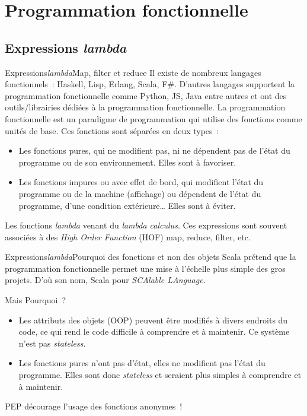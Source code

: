 \documentclass{beamer}
\begin{document}
    \section{Programmation fonctionnelle}

    \subsection{Expressions \textit{lambda}}
    \begin{frame}[fragile]{Expressions\textit{lambda}}{Map, filter et reduce}
        \small
        Il existe de nombreux langages fonctionnels~: Haskell, Lisp, Erlang, Scala, F\#.
        \bigbreak
        D'autres langages supportent la programmation fonctionnelle comme Python, JS, Java entre autres et ont des outils/librairies dédiées à la programmation fonctionnelle.
        \bigbreak
        La programmation fonctionnelle est un paradigme de programmation qui utilise des fonctions comme unités de base.
        Ces fonctions sont séparées en deux types~:
        \begin{itemize}
            \item Les fonctions pures, qui ne modifient pas, ni ne dépendent pas de l'état du programme ou de son environnement. Elles sont à favoriser.
            \item Les fonctions impures ou avec effet de bord, qui modifient l'état du programme ou de la machine (affichage) ou dépendent de l'état du programme, d'une condition extérieure\ldots{} Elles sont à éviter.
        \end{itemize}
        Les fonctions \textit{lambda} venant du \textit{lambda calculus}.
        Ces expressions sont souvent associées à des \textit{High Order Function} (HOF) map, reduce, filter, etc.
    \end{frame}

    \begin{frame}{Expressions\textit{lambda}}{Pourquoi des fonctions et non des objets}
        Scala prétend que la programmation fonctionnelle permet une mise à l'échelle plus simple des gros projets.
        D'où son nom, Scala pour \textit{SCAlable LAnguage}.

        Mais Pourquoi~?
        \bigbreak
        \begin{itemize}
            \item Les attributs des objets (OOP) peuvent être modifiés à divers endroits du code, ce qui rend le code difficile à comprendre et à maintenir.
            Ce système n'est pas \textit{stateless}.
            \item Les fonctions pures n'ont pas d'état, elles ne modifient pas l'état du programme.
            Elles sont donc \textit{stateless} et seraient plus simples à comprendre et à maintenir.
        \end{itemize}
        \begin{dangercolorbox}
            PEP décourage l'usage des fonctions anonymes\footnotemark~!
        \end{dangercolorbox}
    \end{frame}
\end{document}

